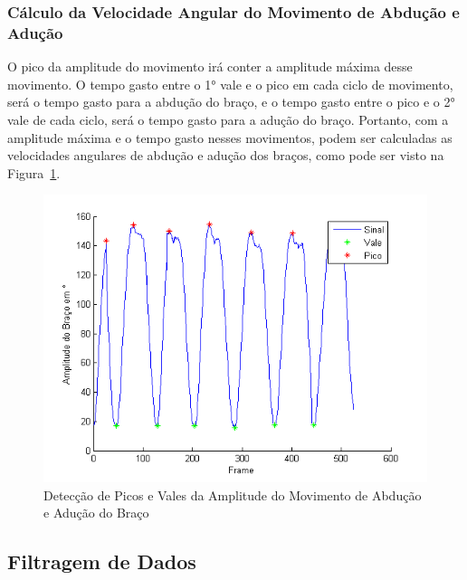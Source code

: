 \subsubsection{Cálculo da Velocidade Angular do Movimento de Abdução e Adução}
O pico da amplitude do movimento irá conter a amplitude máxima desse movimento. O tempo gasto entre o 1° vale e o pico em cada ciclo de movimento, será o tempo gasto para a abdução do braço, e o tempo gasto entre o pico e o 2° vale de cada ciclo, será o tempo gasto para a adução do braço. Portanto, com a amplitude máxima e o tempo gasto nesses movimentos, podem ser calculadas as velocidades angulares de abdução e adução dos braços, como pode ser visto na Figura~\ref{img:amplitude_braco_picos_vales}.
\begin{figure}[!htb]
     \centering
     \includegraphics[width=1\textwidth]{./img/amplitude-braco-picos.png}
     \caption{Detecção de Picos e Vales da Amplitude do Movimento de Abdução e Adução do Braço}
     \label{img:amplitude_braco_picos_vales}
\end{figure}

\subsection{Filtragem de Dados}\label{section:filtro_dados}


